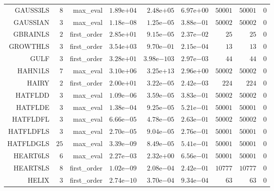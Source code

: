 \begin{longtable}{rrrrrrrrr}
GAUSS3LS & \(     8\) & max\_eval & \( 1.89\)e\(+04\) & \( 2.48\)e\(+05\) & \( 6.97\)e\(+00\) & \( 50001\) & \( 50001\) & \(     0\) \\
GAUSSIAN & \(     3\) & max\_eval & \( 1.18\)e\(-08\) & \( 1.25\)e\(-05\) & \( 3.88\)e\(-01\) & \( 50002\) & \( 50002\) & \(     0\) \\
GBRAINLS & \(     2\) & first\_order & \( 2.85\)e\(+01\) & \( 9.15\)e\(-05\) & \( 2.37\)e\(-02\) & \(    25\) & \(    25\) & \(     0\) \\
GROWTHLS & \(     3\) & first\_order & \( 3.54\)e\(+03\) & \( 9.70\)e\(-01\) & \( 2.15\)e\(-04\) & \(    13\) & \(    13\) & \(     0\) \\
GULF & \(     3\) & first\_order & \( 3.28\)e\(+01\) & \(3.98\)e\(-103\) & \( 2.97\)e\(-03\) & \(    44\) & \(    44\) & \(     0\) \\
HAHN1LS & \(     7\) & max\_eval & \( 3.10\)e\(+06\) & \( 3.25\)e\(+13\) & \( 2.96\)e\(+00\) & \( 50002\) & \( 50002\) & \(     0\) \\
HAIRY & \(     2\) & first\_order & \( 2.00\)e\(+01\) & \( 3.22\)e\(-05\) & \( 2.42\)e\(-03\) & \(   224\) & \(   224\) & \(     0\) \\
HATFLDD & \(     3\) & max\_eval & \( 1.09\)e\(-06\) & \( 3.59\)e\(-05\) & \( 3.83\)e\(-01\) & \( 50002\) & \( 50002\) & \(     0\) \\
HATFLDE & \(     3\) & max\_eval & \( 1.38\)e\(-04\) & \( 9.25\)e\(-05\) & \( 5.21\)e\(-01\) & \( 50001\) & \( 50001\) & \(     0\) \\
HATFLDFL & \(     3\) & max\_eval & \( 6.66\)e\(-05\) & \( 4.78\)e\(-05\) & \( 2.63\)e\(-01\) & \( 50002\) & \( 50002\) & \(     0\) \\
HATFLDFLS & \(     3\) & max\_eval & \( 2.70\)e\(-05\) & \( 9.04\)e\(-05\) & \( 2.76\)e\(-01\) & \( 50001\) & \( 50001\) & \(     0\) \\
HATFLDGLS & \(    25\) & max\_eval & \( 3.39\)e\(-09\) & \( 8.49\)e\(-05\) & \( 5.41\)e\(-01\) & \( 50001\) & \( 50001\) & \(     0\) \\
HEART6LS & \(     6\) & max\_eval & \( 2.27\)e\(-03\) & \( 2.32\)e\(+00\) & \( 6.56\)e\(-01\) & \( 50001\) & \( 50001\) & \(     0\) \\
HEART8LS & \(     8\) & first\_order & \( 1.02\)e\(-09\) & \( 2.08\)e\(-04\) & \( 2.42\)e\(-01\) & \( 10777\) & \( 10777\) & \(     0\) \\
HELIX & \(     3\) & first\_order & \( 2.74\)e\(-10\) & \( 3.70\)e\(-04\) & \( 9.34\)e\(-04\) & \(    63\) & \(    63\) & \(     0\) \\

\end{longtable}
